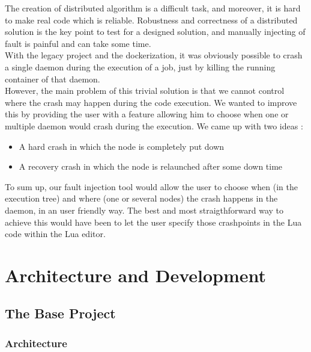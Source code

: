 \documentclass{eplmastersthesis}
\begin{document}
          The creation of distributed algorithm is a difficult task, and
          moreover, it is hard to make real code which is reliable. Robustness
          and correctness of a distributed solution is the key point to test
          for a designed solution, and manually injecting of fault is painful
          and can take some time. \\

          With the legacy project and the dockerization, it was obviously
          possible to crash a single daemon during the execution of a job, just
          by killing the running container of that daemon.\\
          However, the main problem of this trivial solution is that we cannot
          control where the crash may happen during the code execution.
          We wanted to improve this by providing the user with a feature
          allowing him to choose when one or multiple daemon would crash during
          the execution. We came up with two ideas :

          \begin{itemize}
            \item A hard crash in which the node is completely put down
            \item A recovery crash in which the node is relaunched after some
            down time
          \end{itemize}

          To sum up, our fault injection tool would allow the user to choose
          when (in the execution tree) and where (one or several nodes) the
          crash happens in the daemon, in an user friendly way. The best and
          most straigthforward way to achieve this would have been to let
          the user specify those crashpoints in the Lua code within the Lua
          editor.



  \chapter{Architecture and Development}

    \section{The Base Project}

      \subsection{Architecture}
\end{document}
